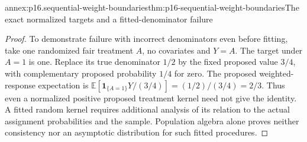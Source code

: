 \begin{annexitem}{annex:p16.sequential-weight-boundaries}{thm:p16-sequential-weight-boundaries}{The exact normalized targets and a fitted-denominator failure}
\begin{proof}
To demonstrate failure with incorrect denominators even before fitting,
take one randomized fair treatment \(A\), no covariates and \(Y=A\).
The target under \(A=1\) is one. Replace its true denominator \(1/2\)
by the fixed proposed value \(3/4\), with complementary proposed
probability \(1/4\) for zero. The proposed weighted-response expectation
is \(\mathbb E[\mathbf1_{\{A=1\}}Y/(3/4)]=(1/2)/(3/4)=2/3\).
Thus even a normalized positive proposed treatment kernel need not give
the identity. A fitted random kernel requires additional analysis of
its relation to the actual assignment probabilities and the sample.
Population algebra alone proves neither consistency nor an asymptotic
distribution for such fitted procedures.
\end{proof}
\end{annexitem}
